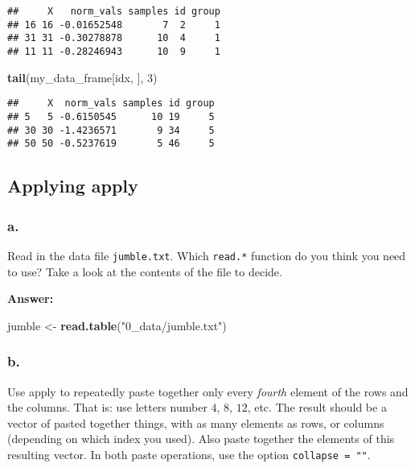 \documentclass[]{article}
\newenvironment{Shaded}{\begin{snugshade}}{\end{snugshade}}
\newcommand{\DecValTok}[1]{\textcolor[rgb]{0.00,0.00,0.81}{#1}}
\newcommand{\KeywordTok}[1]{\textcolor[rgb]{0.13,0.29,0.53}{\textbf{#1}}}
\newcommand{\NormalTok}[1]{#1}
\newcommand{\StringTok}[1]{\textcolor[rgb]{0.31,0.60,0.02}{#1}}
\begin{document}
\begin{verbatim}
##     X   norm_vals samples id group
## 16 16 -0.01652548       7  2     1
## 31 31 -0.30278878      10  4     1
## 11 11 -0.28246943      10  9     1
\end{verbatim}

\begin{Shaded}
\begin{Highlighting}[]
\KeywordTok{tail}\NormalTok{(my_data_frame[idx, ], }\DecValTok{3}\NormalTok{)}
\end{Highlighting}
\end{Shaded}

\begin{verbatim}
##     X  norm_vals samples id group
## 5   5 -0.6150545      10 19     5
## 30 30 -1.4236571       9 34     5
## 50 50 -0.5237619       5 46     5
\end{verbatim}

\hypertarget{applying-apply}{%
\subsection{Applying apply}\label{applying-apply}}

\hypertarget{a.-7}{%
\subsubsection{a.}\label{a.-7}}

Read in the data file \texttt{jumble.txt}. Which \texttt{read.*}
function do you think you need to use? Take a look at the contents of
the file to decide.

\textbf{Answer:}

\begin{Shaded}
\begin{Highlighting}[]
\NormalTok{jumble <-}\StringTok{ }\KeywordTok{read.table}\NormalTok{(}\StringTok{"0_data/jumble.txt"}\NormalTok{)}
\end{Highlighting}
\end{Shaded}

\hypertarget{b.-7}{%
\subsubsection{b.}\label{b.-7}}

Use apply to repeatedly paste together only every \emph{fourth} element
of the rows and the columns. That is: use letters number \(4\), \(8\),
\(12\), etc. The result should be a vector of pasted together things,
with as many elements as rows, or columns (depending on which index you
used). Also paste together the elements of this resulting vector. In
both paste operations, use the option \texttt{collapse\ =\ ""}.
\end{document}
